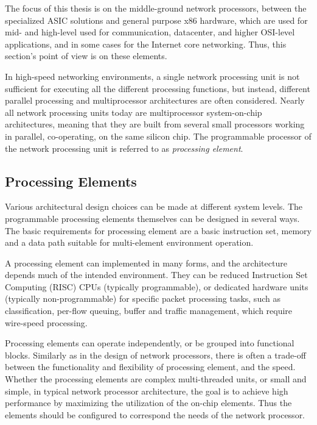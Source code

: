 The focus of this thesis is on the middle-ground network processors, between the specialized ASIC solutions and general purpose x86 hardware, which are used for mid- and high-level used for communication, datacenter, and higher OSI-level applications, and in some cases for the Internet core networking. Thus, this section's point of view is on these elements.

In high-speed networking environments, a single network processing unit is not sufficient for executing all the different processing functions, but instead, different parallel processing and multiprocessor architectures are often considered. Nearly all network processing units today are multiprocessor system-on-chip architectures, meaning that they are built from several small processors working in parallel, co-operating, on the same silicon chip. The programmable processor of the network processing unit is referred to as \emph{processing element}.~\cite{Giladi:2008:Network, Papaefstathiou:2005:Queue}

\subsection{Processing Elements}
Various architectural design choices can be made at different system levels. The programmable processing elements themselves can be designed in several ways. The basic requirements for processing element are a basic instruction set, memory and a data path suitable for multi-element environment operation.~\cite{Giladi:2008:Network}

A processing element can implemented in many forms, and the architecture depends much of the intended environment. They can be reduced Instruction Set Computing (RISC) CPUs (typically programmable), or dedicated hardware units (typically non-programmable) for specific packet processing tasks, such as classification, per-flow queuing, buffer and traffic management, which require wire-speed processing.~\cite{Giladi:2008:Network}

Processing elements can operate independently, or be grouped into functional blocks. Similarly as in the design of network processors, there is often a trade-off between the functionality and flexibility of processing element, and the speed. Whether the processing elements are complex multi-threaded units, or small and simple, in typical network processor architecture, the goal is to achieve high performance by maximizing the utilization of the on-chip elements. Thus the elements should be configured to correspond the needs of the network processor.~\cite{Giladi:2008:Network}

